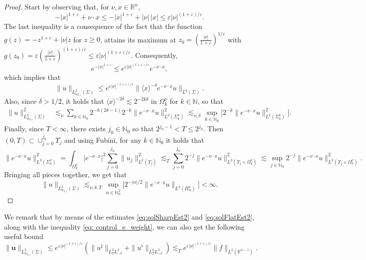 \documentclass[10pt,a4paper]{amsart}
\theoremstyle{remark}
\theoremstyle{definition}
\newcommand{\R}{\mathbb{R}}
\newcommand{\N}{\mathbb{N}}
\newcommand{\x}{\mathrm{x}}
\def\ve{\varepsilon}
\def\lec{\lesssim}
\begin{document}
\begin{proof}
Start by observing that, for $\nu,x\in\R^n$,
\[
-|x|^{1+\ve}+\nu\cdot x\leq-|x|^{1+\ve}+|\nu|\, |x|\leq \ve |\nu|^{(1+\ve)/\ve}. 
\]
The last inequality is a consequence of the fact that the function $g(z)=-z^{1+\ve}+|\nu|z$ for $z\geq 0$, attains its maximum at $z_0=\left(\frac{|\nu|}{1+\ve}\right)^{1/\ve}$ with $g(z_0)=\ve\left(\frac{|\nu|}{1+\ve}\right)^{(1+\ve)/\ve}\leq \ve |\nu|^{(1+\ve)/\ve}$. 
Consequently,
%
\begin{equation}\label{eq: control_e_weight}
e^{-|x|^{1+\ve}}%
\leq e^{\ve |\nu|^{(1+\ve)/\ve}} e^{-\nu\cdot x}, 
\end{equation}
%
which implies that
%
\[
\|u\|_{L^2_{w_{\delta, \ve}}(\Sigma)}\leq e^{\ve |\nu|^{(1+\ve)/\ve}}\|\langle x\rangle^{-\delta}e^{-\nu\cdot x}u\|_{L^2(\Sigma)}.
\]
%
Also, since $\delta>1/2$, it holds that $\langle x\rangle^{-2\delta}\lesssim 2^{-2k\delta}$ in $\Omega_k^\nu$ for $k\in\N$, so that
%
\[
\begin{aligned}
\|u\|_{L^2_{w_{\delta, \ve}}(\Sigma)}^2&\lesssim_\nu \sum_{ k \in\N_0} 2^{-k (2\delta-1)} 2^{-k} \| e^{-\nu\cdot x}u \|_{L^2(\Sigma^\nu_k)}^2
%
\lec_{\nu,\delta}
%
\sup_{k\in\N_0}\big[ 2^{-k}\| e^{-\nu\cdot x}u \|_{L^2(\Sigma^\nu_k)}^2 \big].
\end{aligned}
\]
%
Finally, since $T<\infty$, there exists $j_0\in\N_0$ so that $2^{j_0-1}< T \leq 2^{j_0}$. Then $(0, T) \subset \cup_{j=0}^{j_0} \Upsilon_j$ and using Fubini, for any $k\in\N_0$ it holds that
%
\[
\| e^{-\nu \cdot x} u \|^2_{L^2(\Sigma^\nu_k)} = \int_{\Omega_k^\nu} |e^{-\nu\cdot x}|^2 \sum_{j=0}^{j_0} \|u_j\|_{L^2(\Upsilon_j)}^2
\lec_T \sum_{j=0}^{j_0} 2^{-j} \| e^{-\nu\cdot x} u\|^2_{L^2(\Upsilon_j\times\Omega_k^\nu)}
\lesssim \sup_{j\in\N_0}2^{-j}\|e^{-\nu\cdot x}  u\|^2_{L^2(\Upsilon_j\times\Omega_k^\nu)}.
\]
%
Bringing all pieces together, we get that
%
\[
\|u\|_{L^2_{w_{\delta, \ve}}(\Sigma)}\lesssim_{\nu,\delta,T} \sup_{\alpha \in \N_0^2} \big[ 2^{-|\alpha|/2} \| e^{- \nu \cdot \x} u \|_{L^2(\Pi_\alpha^\nu)} \big] < \infty.
\]
%
\end{proof}
%
We remark that by means of the estimates \eqref{eq:solSharpEst2} and \eqref{eq:solFlatEst2}, along with the inequality \eqref{eq: control_e_weight}, we can also get the following useful bound  
%
	\begin{equation}\label{eq: CGO_solution_in_H_norm}
	\|\mathbf{u}\|_{L^2_{w_{\delta, \ve}}(\Sigma)} \leq e^{\ve |\nu|^{(1+\ve)/\ve}} (\|u^\sharp\|_{L^2_TL^2_{-\delta}} + \|u^\flat\|_{L^2_TL^2_{-\delta}}) 
	\lec_T e^{\ve |\nu|^{(1+\ve)/\ve}} \|f\|_{L^2(\R^{n-1})}.
	\end{equation}
%
\end{document}
